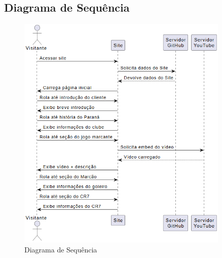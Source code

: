 \documentclass[12pt,a4paper]{article}
\begin{document}
\subsection{Diagrama de Sequência}
\begin{figure}[H]
    \centering
    \includegraphics[width=0.9\textwidth]{sequencia.png}
    \caption{Diagrama de Sequência}
\end{figure}
\end{document}
